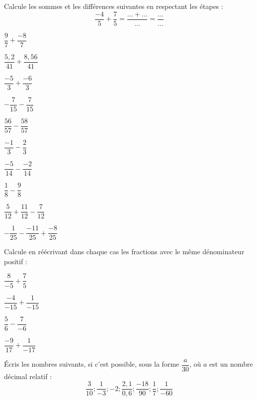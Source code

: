 \begin{exercice}[La règle]
Calcule les sommes et les différences suivantes en respectant les étapes :
\[ \dfrac{-4}{5} + \dfrac{7}{5} = \dfrac{... + ...}{...} = \dfrac{...}{...} \]

\begin{colenumerate}{2} 
\item $\dfrac{9}{7} + \dfrac{-8}{7}$
\item $\dfrac{5,2}{41} + \dfrac{8,56}{41}$
\item $\dfrac{-5}{3} + \dfrac{-6}{3}$
\item $-\dfrac{7}{15} - \dfrac{7}{15}$
\item $\dfrac{56}{57} - \dfrac{58}{57}$
\item $\dfrac{-1}{3} - \dfrac{2}{3}$
\item $\dfrac{-5}{14} - \dfrac{-2}{14}$
\item $\dfrac{1}{8} - \dfrac{9}{8}$
\item $\dfrac{5}{12} + \dfrac{11}{12} - \dfrac{7}{12}$
\item $-\dfrac{1}{25} - \dfrac{-11}{25} + \dfrac{-8}{25}$
\end{colenumerate} 
\end{exercice}

\begin{exercice}

Calcule en réécrivant dans chaque cas les fractions avec le même dénominateur positif :

\begin{colenumerate}{2} 
\item $\dfrac{8}{-5} + \dfrac{7}{5}$
\item $\dfrac{-4}{-15} + \dfrac{1}{-15}$
\item $\dfrac{5}{6} - \dfrac{7}{-6}$
\item $\dfrac{-9}{17} + \dfrac{1}{-17}$
\end{colenumerate} 
 

\end{exercice}

\begin{exercice}
Écris les nombres suivants, si c'est possible, sous la forme $\dfrac{a}{30}$, où $a$ est un nombre décimal relatif :
\[ \dfrac{3}{10} ; \dfrac{1}{-3} ; -2 ; \dfrac{2,1}{0,6} ; \dfrac{-18}{90} ; \dfrac{1}{7} ; \dfrac{1}{-60} \]
\end{exercice}

